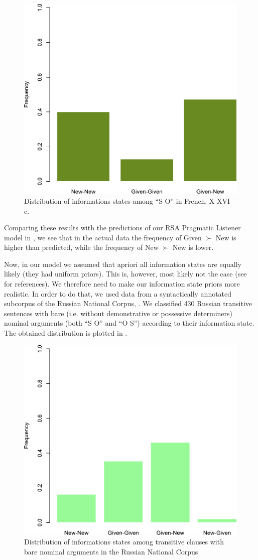 \documentclass[output=paper,modfonts,nonflat]{langsci/langscibook}
\begin{document}
\begin{figure}
\includegraphics[width=.666\textwidth]{figures/plotFrenchSbjObj}
\caption{Distribution of informations states among  ``S O'' in French, X-XVI c.}\label{figure:corpusSbjObj}
\end{figure}

Comparing these results with the predictions of our RSA Pragmatic Listener model in , we see that in the actual data the frequency of Given $\succ$ New is higher than predicted, while the frequency of New $\succ$ New is lower.

Now, in our model we assumed that apriori all information states are equally likely (they had uniform priors). This is, however, most likely not the case (see \citealt{Birner:2012} for references). We therefore need to make our information state priors more realistic. In order to do that, we used data from a syntactically annotated subcorpus of the Russian National Corpus, \citet{RNC}. We classified 430 Russian transitive sentences with bare (i.e. without demonstrative or possessive determiners) nominal arguments (both  ``S O'' and  ``O S'') according to their information state. The obtained distribution is plotted in .

\begin{figure}
\includegraphics[width=.666\textwidth]{figures/plotRussianSbjObj}
\caption{Distribution of informations states among transitive clauses with bare nominal arguments in the Russian National Corpus}\label{figure:Russian}
\end{figure}
\end{document}

